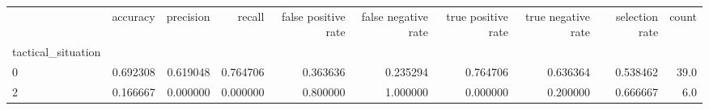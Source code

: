 \begin{tabular}{lrrrrrrrrr}
\toprule
{} &  accuracy &  precision &    recall &  false positive rate &  false negative rate &  true positive rate &  true negative rate &  selection rate &  count \\
tactical\_situation &           &            &           &                      &                      &                     &                     &                 &        \\
\midrule
0                  &  0.692308 &   0.619048 &  0.764706 &             0.363636 &             0.235294 &            0.764706 &            0.636364 &        0.538462 &   39.0 \\
2                  &  0.166667 &   0.000000 &  0.000000 &             0.800000 &             1.000000 &            0.000000 &            0.200000 &        0.666667 &    6.0 \\
\bottomrule
\end{tabular}
